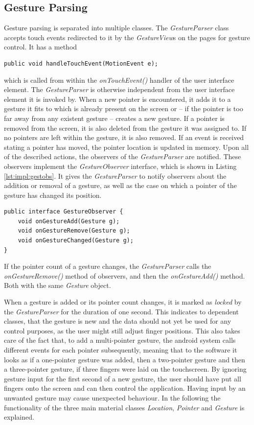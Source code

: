 \subsection{Gesture Parsing}

Gesture parsing is separated into multiple classes. The \textit{GestureParser} class accepts touch events redirected to it by the \textit{GestureView}s on the pages for gesture control. It has a method 
\begin{lstlisting}
public void handleTouchEvent(MotionEvent e);
\end{lstlisting}
which is called from within the \textit{onTouchEvent()} handler of the user interface element. The \textit{GestureParser} is otherwise independent from the user interface element it is invoked by. When a new pointer is encountered, it adds it to a gesture it fits to which is already present on the screen or -- if the pointer is too far away from any existent gesture -- creates a new gesture. If a pointer is removed from the screen, it is also deleted from the gesture it was assigned to. If no pointers are left within the gesture, it is also removed. If an event is received stating a pointer has moved, the pointer location is updated in memory. Upon all of the described actions, the observers of the \textit{GestureParser} are notified. These observers implement the \textit{GestureObserver} interface, which is shown in Listing \ref{lst:impl:gestobs}. It gives the \textit{GestureParser} to notify observers about the addition or removal of a gesture, as well as the case on which a pointer of the gesture has changed its position. 

\begin{lstlisting}[caption={The GestureObserver interface}, label=lst:impl:gestobs]
public interface GestureObserver {
	void onGestureAdd(Gesture g);
	void onGestureRemove(Gesture g);
	void onGestureChanged(Gesture g);
}
\end{lstlisting}

If the pointer count of a gesture changes, the \textit{GestureParser} calls the \textit{onGestureRemove()} method of observers, and then the \textit{onGestureAdd()} method. Both with the same \textit{Gesture} object.

When a gesture is added or its pointer count changes, it is marked as \textit{locked} by the \textit{GestureParser} for the duration of one second. This indicates to dependent classes, that the gesture is new and the data should not yet be used for any control purposes, as the user might still adjust finger positions. This also takes care of the fact that, to add a multi-pointer gesture, the android system calls different events for each pointer subsequently, meaning that to the software it looks as if a one-pointer gesture was added, then a two-pointer gesture and then a three-pointer gesture, if three fingers were laid on the touchscreen. By ignoring gesture input for the first second of a new gesture, the user should have put all fingers onto the screen and can then control the application. Having input by an unwanted gesture may cause unexpected behaviour. In the following the functionality of the three main material classes \textit{Location}, \textit{Pointer} and \textit{Gesture} is explained.

